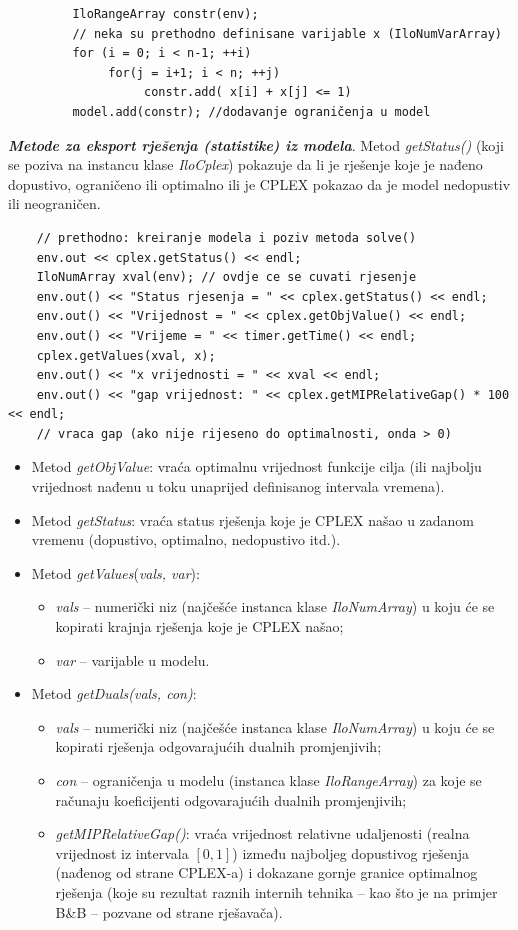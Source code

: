 \documentclass[a4paper, utf8, 11pt, colorlinks]{book}
\theoremstyle{definition}
\begin{document}
 \begin{verbatim}
 	     IloRangeArray constr(env);
 	     // neka su prethodno definisane varijable x (IloNumVarArray) 
 	     for (i = 0; i < n-1; ++i)
 	          for(j = i+1; i < n; ++j)
 	               constr.add( x[i] + x[j] <= 1)     
      	 model.add(constr); //dodavanje ograničenja u model
 \end{verbatim}
 
 \noindent \textbf{\emph{Metode za eksport rješenja (statistike) iz modela}}. Metod \emph{getStatus()} (koji se poziva na instancu klase \emph{IloCplex})  pokazuje da li je rješenje koje je nađeno dopustivo, ograničeno ili optimalno ili je CPLEX pokazao da je model nedopustiv ili neograničen.
 
 \begin{verbatim}
 	// prethodno: kreiranje modela i poziv metoda solve()
    env.out << cplex.getStatus() << endl;
 	IloNumArray xval(env); // ovdje ce se cuvati rjesenje
 	env.out() << "Status rjesenja = " << cplex.getStatus() << endl;
 	env.out() << "Vrijednost = " << cplex.getObjValue() << endl;
 	env.out() << "Vrijeme = " << timer.getTime() << endl;
 	cplex.getValues(xval, x);
 	env.out() << "x vrijednosti = " << xval << endl;
 	env.out() << "gap vrijednost: " << cplex.getMIPRelativeGap() * 100 << endl; 
 	// vraca gap (ako nije rijeseno do optimalnosti, onda > 0)
 \end{verbatim}
\begin{itemize}
	\item Metod \emph{getObjValue}: vraća optimalnu vrijednost funkcije cilja (ili najbolju vrijednost nađenu u toku unaprijed definisanog intervala vremena).
	\item Metod \emph{getStatus}: vraća status rješenja koje je CPLEX našao u zadanom vremenu (dopustivo, optimalno, nedopustivo itd.).
	\item Metod \emph{getValues}(\emph{vals, var}): 
	\begin{itemize}
	 	  \item \emph{vals} -- numerički niz (najčešće instanca klase \emph{IloNumArray}) u koju će se kopirati krajnja rješenja koje je CPLEX našao;    
          \item \emph{var} -- varijable u modelu.
    \end{itemize}
     \item Metod \emph{getDuals(vals, con)}:
     \begin{itemize}
     	\item \emph{vals} -- numerički niz (najčešće instanca klase \emph{IloNumArray}) u koju će se kopirati rješenja odgovarajućih dualnih promjenjivih;
     	\item \emph{con} -- ograničenja u modelu (instanca klase \emph{IloRangeArray}) za koje se računaju koeficijenti odgovarajućih dualnih promjenjivih;
     	\item \emph{getMIPRelativeGap()}: vraća vrijednost relativne udaljenosti (realna vrijednost iz intervala $[0, 1]$) između najboljeg dopustivog rješenja (nađenog od strane CPLEX-a) i dokazane gornje granice optimalnog rješenja (koje su rezultat raznih internih tehnika -- kao što je na primjer B\&B -- pozvane od strane rješavača).
     \end{itemize}
\end{itemize}
\end{document}

